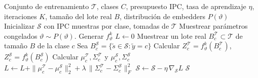 

\setcounter{algorithm}{0}
\begin{algorithm}[H]
\caption{Destilación por alineación tabular mediante incrustaciones de momentos (TAME)}
\begin{algorithmic}[1]
\Require Conjunto de entrenamiento $\mathcal{T}$, clases $C$, presupuesto IPC, tasa de aprendizaje $\eta$, iteraciones $K$, tamaño del lote real $B$, distribución de embedders $P(\vartheta)$
\State Inicializar $\mathcal{S}$ con IPC muestras por clase, tomadas de $\mathcal{T}$
  \State Muestrear parámetros congelados $\vartheta \sim P(\vartheta)$. Generar $f_\vartheta^k$
  \State $L \gets 0$
    \State Muestrear un lote real $B_c^{\mathcal{T}} \subset \mathcal{T}$ de tamaño $B$ de la clase $c$
    \State Sea $B_c^{\mathcal{S}} = \{\tilde{s} \in \mathcal{S} : \tilde{y} = c\}$
    \State Calcular $Z_c^{\mathcal{T}} = f_\vartheta^k(B_c^{\mathcal{T}})$, \quad $Z_c^{\mathcal{S}} = f_\vartheta^k(B_c^{\mathcal{S}})$
    \State Calcular $\mu_c^{\mathcal{T}}, \Sigma_c^{\mathcal{T}}$ y $\mu_c^{\mathcal{S}}, \Sigma_c^{\mathcal{S}}$
    \State $L \gets L + \|\mu_c^{\mathcal{T}} - \mu_c^{\mathcal{S}}\|_2^2 + \lambda\,\|\Sigma_c^{\mathcal{T}} - \Sigma_c^{\mathcal{S}}\|_F^2$
  \EndFor
  \State $\mathcal{S} \gets \mathcal{S} - \eta\,\nabla_{\mathcal{S}} L$
\EndFor
\State \Return $\mathcal{S}$
\end{algorithmic}
\end{algorithm}

